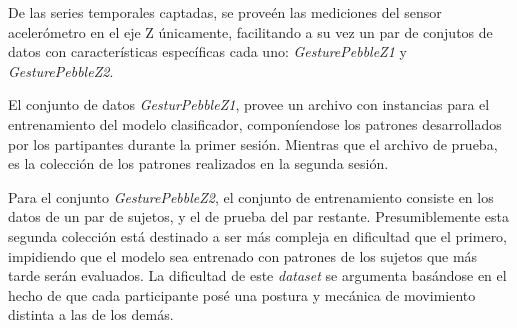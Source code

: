 \hfill\break
\justifying
De las series temporales captadas, se proveén las mediciones del sensor acelerómetro en el eje Z únicamente, facilitando a su vez un par de conjutos de datos con características específicas cada uno: \textit{GesturePebbleZ1} y \textit{GesturePebbleZ2}.

\hfill\break
\justifying
El conjunto de datos \textit{GesturPebbleZ1}, provee un archivo con instancias para el entrenamiento del modelo clasificador, componíendose los patrones desarrollados por los partipantes durante la primer sesión. Mientras que el archivo de prueba, es la colección de los patrones realizados en la segunda sesión.

\hfill\break
\justifying
Para el conjunto \textit{GesturePebbleZ2}, el conjunto de entrenamiento consiste en los datos de un par de sujetos, y el de prueba del par restante. Presumiblemente esta segunda colección está destinado a ser más compleja en dificultad que el primero, impidiendo que el modelo sea entrenado con patrones de los sujetos que más tarde serán evaluados. La dificultad de este \textit{dataset} se argumenta basándose en el hecho de que cada participante posé una postura y mecánica de movimiento distinta a las de los demás.